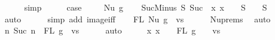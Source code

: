 \begin{isabellebody}
\ \ \ \ \isamarkupfalse%
\ simp\isanewline
\ \ \isamarkupfalse%
\ \isamarkupfalse%
\ {\isacharquery}{\kern0pt}case\ \isakeywordONE{{\isachardot}{\kern0pt}}\isamarkupfalse%
\isanewline
{}\isamarkupfalse%
\isanewline
\ \ \isamarkupfalse%
\ {\isacharparenleft}{\kern0pt}Nu\ g{\isacharparenright}{\kern0pt}\isanewline
\isanewline
\ \ \isamarkupfalse%
\ SucMinus{\isacharcolon}{\kern0pt}\ {\isachardoublequoteopen}{\isasymforall}S{\isachardot}{\kern0pt}\ Suc\ {\isacharbackquote}{\kern0pt}\ {\isacharparenleft}{\kern0pt}{\isasymlambda}x{\isachardot}{\kern0pt}\ x\ {\isacharminus}{\kern0pt}\ {}{\isacharparenright}{\kern0pt}\ {\isacharbackquote}{\kern0pt}\ {\isacharparenleft}{\kern0pt}S\ {\isacharminus}{\kern0pt}\ {\isacharbraceleft}{\kern0pt}{}{\isacharbraceright}{\kern0pt}{\isacharparenright}{\kern0pt}\ {\isacharequal}{\kern0pt}\ S\ {\isacharminus}{\kern0pt}\ {\isacharbraceleft}{\kern0pt}{}{\isacharbraceright}{\kern0pt}{\isachardoublequoteclose}\isanewline
\ \ \ \ \isamarkupfalse%
\ auto\isanewline
\ \ \ \ \isamarkupfalse%
\ {\isacharparenleft}{\kern0pt}simp\ add{\isacharcolon}{\kern0pt}\ image{\isacharunderscore}{\kern0pt}iff{\isacharparenright}{\kern0pt}\isanewline
\isanewline
\ \ \isamarkupfalse%
\ {\isachardoublequoteopen}FL\ {\isacharparenleft}{\kern0pt}Nu\ g{\isacharparenright}{\kern0pt}\ {\isasymsubseteq}\ vs{\isachardoublequoteclose}\isanewline
\ \ \ \ \isamarkupfalse%
\ Nu{\isachardot}{\kern0pt}prems{\isacharparenleft}{\kern0pt}{}{\isacharparenright}{\kern0pt}\ \isamarkupfalse%
\ auto\isanewline
\ \ \isamarkupfalse%
\ \isamarkupfalse%
\ {\isachardoublequoteopen}{\isacharbraceleft}{\kern0pt}n{\isachardot}{\kern0pt}\ Suc\ n\ {\isasymin}\ FL\ g{\isacharbraceright}{\kern0pt}\ {\isasymsubseteq}\ vs{\isachardoublequoteclose}\isanewline
\ \ \ \ \isamarkupfalse%
\ auto\isanewline
\ \ \isamarkupfalse%
\ \isamarkupfalse%
\ {\isachardoublequoteopen}{\isacharparenleft}{\kern0pt}{\isasymlambda}x{\isachardot}{\kern0pt}\ x\ {\isacharminus}{\kern0pt}\ {}{\isacharparenright}{\kern0pt}\ {\isacharbackquote}{\kern0pt}\ {\isacharparenleft}{\kern0pt}FL\ g\ {\isacharminus}{\kern0pt}\ {\isacharbraceleft}{\kern0pt}{}{\isacharbraceright}{\kern0pt}{\isacharparenright}{\kern0pt}\ {\isasymsubseteq}\ vs{\isachardoublequoteclose}\isanewline

\end{isabellebody}
